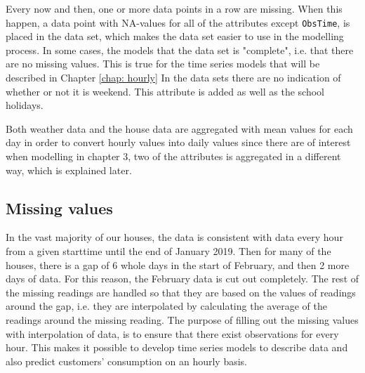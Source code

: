 \noindent Every now and then, one or more data points in a row are missing. When this happen, a data point with NA-values for all of the attributes except \texttt{ObsTime}, is placed in the data set, which makes the data set easier to use in the modelling process. In some cases, the models that the data set is "complete", i.e. that there are no missing values. This is true for the time series models that will be described in Chapter \ref{chap: hourly} In the data sets there are no indication of whether or not it is weekend. This attribute is added as well as the school holidays.

\noindent Both weather data and the house data are aggregated with mean values for each day in order to convert hourly values into daily values since there are of interest when modelling in chapter 3, two of the attributes is aggregated in a different way, which is explained later.





\subsection{Missing values}
In the vast majority of our houses, the data is consistent with data every hour from a given starttime until the end of January 2019. Then for many of the houses, there is a gap of 6 whole days in the start of February, and then 2 more days of data. For this reason, the February data is cut out completely. The rest of the missing readings are handled so that they are based on the values of readings around the gap, i.e. they are interpolated by calculating the average of the readings around the missing reading.
The purpose of filling out the missing values with interpolation of data, is to ensure that there exist observations for every hour. This makes it possible to develop time series models to describe data and also predict customers' consumption on an hourly basis.

